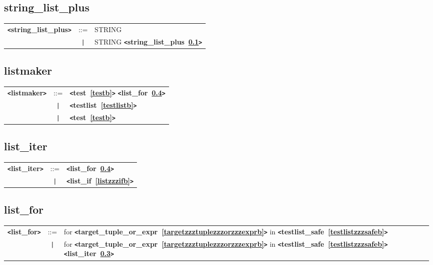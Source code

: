 \documentclass[12pt]{article}
\begin{document}
\subsection{string\_list\_plus}
\label{stringzzzlistzzzplusb}
\begin{tabular}{lcl}
{\bf \verb+<+string\_list\_plus\verb+>+} & ::=  & STRING \\
 & \verb+|+  & STRING {\bf \verb+<+string\_list\_plus~\ref{stringzzzlistzzzplusb}\verb+>+}  \\
\end{tabular}

\subsection{listmaker}
\label{listmakerb}
\begin{tabular}{lcl}
{\bf \verb+<+listmaker\verb+>+} & ::=  & {\bf \verb+<+test~\ref{testb}\verb+>+}  {\bf \verb+<+list\_for~\ref{listzzzforb}\verb+>+}  \\
 & \verb+|+  & {\bf \verb+<+testlist~\ref{testlistb}\verb+>+}  \\
 & \verb+|+  & {\bf \verb+<+test~\ref{testb}\verb+>+}  \\
\end{tabular}

\subsection{list\_iter}
\label{listzzziterb}
\begin{tabular}{lcl}
{\bf \verb+<+list\_iter\verb+>+} & ::=  & {\bf \verb+<+list\_for~\ref{listzzzforb}\verb+>+}  \\
 & \verb+|+  & {\bf \verb+<+list\_if~\ref{listzzzifb}\verb+>+}  \\
\end{tabular}

\subsection{list\_for}
\label{listzzzforb}
\newlength{\tw}
\settowidth{\tw}{list\_for  ::=  }
\addtolength{\tw}{2\arraycolsep}
\newlength{\len}
\setlength{\len}{\textwidth}
\addtolength{\len}{-1\tw}
\begin{tabular}{lcp{\len}}
{\bf \verb+<+list\_for\verb+>+} & ::=  & for {\bf \verb+<+target\_tuple\_or\_expr~\ref{targetzzztuplezzzorzzzexprb}\verb+>+}  in {\bf \verb+<+testlist\_safe~\ref{testlistzzzsafeb}\verb+>+}  \\
 & \verb+|+  & for {\bf \verb+<+target\_tuple\_or\_expr~\ref{targetzzztuplezzzorzzzexprb}\verb+>+}  in {\bf \verb+<+testlist\_safe~\ref{testlistzzzsafeb}\verb+>+}  {\bf \verb+<+list\_iter~\ref{listzzziterb}\verb+>+}  \\
\end{tabular} \\
\end{document}
